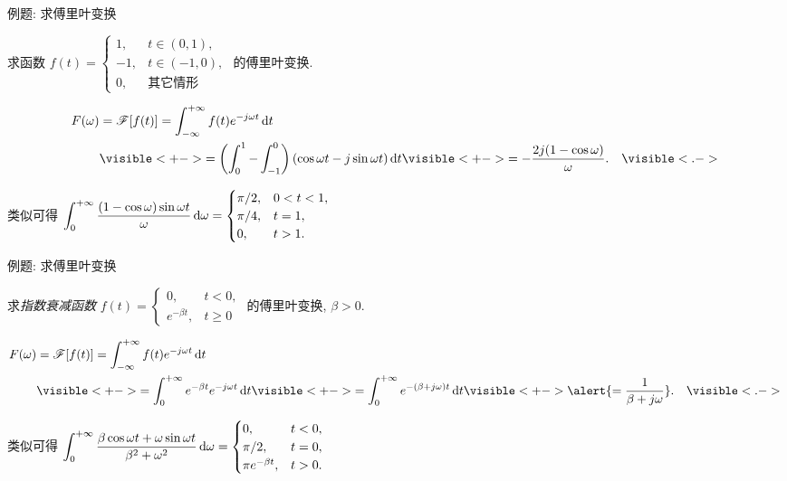 \begin{frame}{例题: 求傅里叶变换}
	\onslide<+->
	\begin{example}
		求函数 $f(t)=
			\begin{cases}
				1,&t\in(0,1),\\
				-1,&t\in(-1,0),\\
				0,&\text{其它情形}
			\end{cases}$
		的傅里叶变换.
	\end{example}

	\onslide<+->
	\begin{solution}
		\vspace{-\baselineskip}
		\begin{align*}
			F(\omega)&=\msf[f(t)]=\int_{-\infty}^{+\infty}f(t)e^{-j\omega t}\diff t\\
			&\visible<+->{=\left(\int_0^1-\int_{-1}^0\right)(\cos\omega t-j\sin\omega t)\diff t}
			\visible<+->{=-\frac{2j(1-\cos\omega)}\omega.}&\visible<.->{}
		\end{align*}
	\end{solution}
	
	\onslide<+->
	类似可得
	$\displaystyle\int_0^{+\infty}\frac{(1-\cos\omega)\sin\omega t}\omega\,\mathrm{d}\omega=
		\begin{cases}
			\pi/2,&0<t<1,\\
			\pi/4,&t=1,\\
			0,&t>1.	
		\end{cases}$
\end{frame}


\begin{frame}{例题: 求傅里叶变换}
	\onslide<+->
	\begin{example}
		求\emph{指数衰减函数} $f(t)=
			\begin{cases}
				0,&t<0,\\
				e^{-\beta t},&t\ge 0
			\end{cases}$ 的傅里叶变换, $\beta>0$.
	\end{example}

	\onslide<+->
	\begin{solution}
		\vspace{-\baselineskip}
		\begin{align*}
			F(\omega)&=\msf[f(t)]=\int_{-\infty}^{+\infty}f(t)e^{-j\omega t}\diff t\\
			&\visible<+->{=\int_0^{+\infty}e^{-\beta t}e^{-j\omega t}\diff t}
			\visible<+->{=\int_0^{+\infty}e^{-(\beta+j\omega)t}\diff t}
			\visible<+->{\alert{=\frac1{\beta+j\omega}}.}&\visible<.->{}
		\end{align*}
	\end{solution}
	
	\onslide<+->
	类似可得
	$\displaystyle\int_0^{+\infty}\frac{\beta\cos\omega t+\omega\sin\omega t}{\beta^2+\omega^2}\,\mathrm{d}\omega=
		\begin{cases}
			0,&t<0,\\
			\pi/2,&t=0,\\
			\pi e^{-\beta t},&t>0.
		\end{cases}$
\end{frame}


